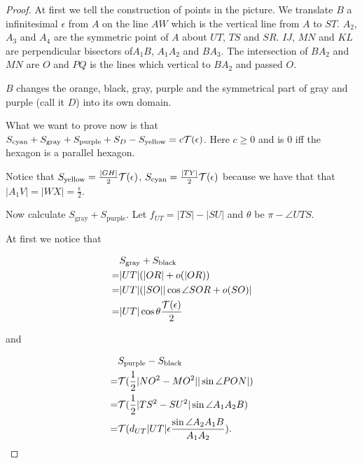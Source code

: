 \begin{proof}
	At first we tell the construction of points in the picture.
	We translate $B$ a infinitesimal $\epsilon$ from $A$ on the line $AW$
	which is the vertical line from $A$ to $ST$. $A_2$, $A_3$ and $A_4$ are
	the symmetric point of $A$ about $UT$, $TS$ and $SR$. $IJ$, $MN$ and 
	$KL$ are perpendicular bisectors of$A_1B$, $A_1A_2$ and $BA_3$. 
	The intersection of $BA_2$ and $MN$ are $O$ and $PQ$ is the lines which 
	vertical to $BA_2$ and passed $O$.
	
	$B$ changes the orange, black, gray, purple and the symmetrical part
	of gray and purple (call it $D$) into its own domain. 
	
	What we want to prove now is that $S_{\text{cyan}} + S_{\text{gray}} +
	S_{\text{purple}} + S_{D} - S_{\text{yellow}} = c\mathcal{T}(\epsilon) $. 
	Here $c\geq0$ and is $0$ iff the
	hexagon is a parallel hexagon.
	
	Notice that $S_{\text{yellow}} = \frac{|GH|}{2}\mathcal{T}(\epsilon)$, 
	$S_{\text{cyan}} = \frac{|TY|}{2}\mathcal{T}(\epsilon)$ 
	because we have that that $|A_1V| = |WX| = \frac{\epsilon}{2}$.
	
	Now calculate $S_{\text{gray}}+S_{\text{purple}}$. Let $f_{UT} = |TS| - |SU|$ 
	and $\theta$ be $\pi - \angle UTS$.
	
	At first we notice that 
	
	\begin{equation}
	\begin{split}
	&S_{\text{gray}} + S_{\text{black}}\\
	=&|UT|(|OR| + o(|OR))\\
	=&|UT|(|SO||\cos \angle SOR + o(SO)|\\
	=&|UT|\cos\theta \frac{\mathcal{T}(\epsilon)}{2}
	\end{split}
	\end{equation}
	
	and	
	
	\begin{equation}
	\begin{split}
	&S_{\text{purple}} - S_{\text{black}}\\
	=&\mathcal{T}(\frac{1}{2}|NO^2 - MO^2||\sin\angle PON|)\\
	=&\mathcal{T}(\frac{1}{2}|TS^2 - SU^2|\sin \angle A_1A_2B)\\
	=&\mathcal{T}(d_{UT}|UT|\epsilon\frac{\sin \angle A_2A_1B}{A_1A_2}).
	\end{split}
	\end{equation}
	

\end{proof}

